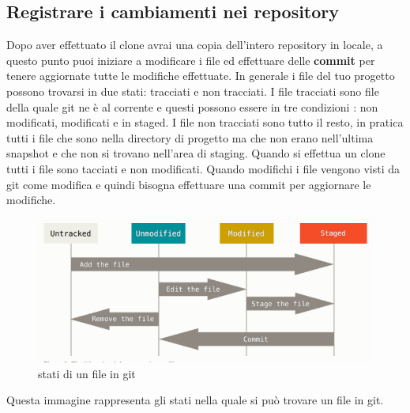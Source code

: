 \subsection{Registrare i cambiamenti nei repository}
Dopo aver effettuato il clone avrai una copia dell'intero repository in locale, a questo punto puoi iniziare a modificare i file ed effettuare delle \textbf{commit} per tenere aggiornate tutte le modifiche effettuate. In generale i file del tuo progetto possono trovarsi in due stati: tracciati e non tracciati.
I file tracciati sono file della quale git ne è al corrente e questi possono essere in tre condizioni : non modificati, modificati e in staged.
I file non tracciati sono tutto il resto, in pratica tutti i file che sono nella directory di progetto ma che non erano nell'ultima snapshot e che non si trovano nell'area di staging. Quando si effettua un clone tutti i file sono tacciati e non modificati. Quando modifichi i file vengono visti da git come modifica e quindi bisogna effettuare una commit per aggiornare le modifiche.
\begin{figure}[ht]
					\centering
					\includegraphics[width=1 \textwidth]{immagini/stato1.png}
					\subitem \caption{stati di un file in git}
					\label{json:imm}
\end{figure}
Questa immagine rappresenta gli stati nella quale si può trovare un file in git.

